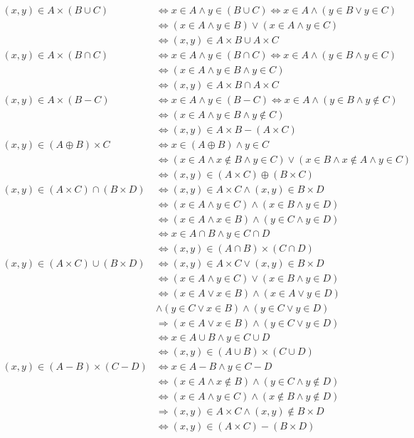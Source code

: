 \begin{align*}
(x,y)\in A\times(B\cup C)&\Leftrightarrow x\in A\land y\in (B\cup C)\Leftrightarrow x\in A\land (y\in B\lor y\in C)\\
&\Leftrightarrow (x\in A\land y\in B)\lor(x\in A\land y\in C)\\&\Leftrightarrow (x,y)\in A\times B\cup A\times C\\
(x,y)\in A\times(B\cap C)&\Leftrightarrow x\in A\land y\in (B\cap C)\Leftrightarrow x\in A\land (y\in B\land y\in C)\\
&\Leftrightarrow (x\in A\land y\in B\land y\in C)\\&\Leftrightarrow (x,y)\in A\times B\cap A\times C\\
(x,y)\in A\times(B-C)&\Leftrightarrow x\in A\land y\in (B-C)\Leftrightarrow x\in A\land (y\in B\land y\not\in C)\\
&\Leftrightarrow (x\in A\land y\in B\land y\not\in C)\\&\Leftrightarrow (x,y)\in A\times B-(A\times C)\\
(x,y)\in (A\oplus B)\times C&\Leftrightarrow x\in (A\oplus B)\land y\in C\\
&\Leftrightarrow (x\in A\land x\not\in B\land y\in C)\lor(x\in B\land x\not\in A\land y\in C)\\
&\Leftrightarrow (x,y)\in(A\times C)\oplus(B\times C)\\
(x,y) \in (A \times C) \cap (B \times D) &\Leftrightarrow (x,y) \in A \times C \land (x,y) \in B \times D \\
&\Leftrightarrow (x \in A \land y \in C) \land (x \in B \land y \in D) \\
&\Leftrightarrow (x \in A \land x \in B) \land (y \in C \land y \in D) \\
&\Leftrightarrow x \in A \cap B \land y \in C \cap D \\
&\Leftrightarrow (x,y) \in (A \cap B) \times (C \cap D)\\
(x,y) \in (A \times C) \cup (B \times D) &\Leftrightarrow (x,y) \in A \times C \lor (x,y) \in B \times D \\
&\Leftrightarrow (x \in A \land y \in C) \lor (x \in B \land y \in D) \\
&\Leftrightarrow (x\in A\lor x\in B)\land(x\in A\lor y\in D)\\ &\land(y\in C\lor x\in B)\land(y\in C\lor y\in D)\\
&\Rightarrow (x \in A \lor x \in B) \land (y \in C \lor y \in D)\\
&\Leftrightarrow x \in A \cup B \land y \in C \cup D \\
&\Leftrightarrow (x,y) \in (A \cup B) \times (C \cup D)\\
(x,y) \in (A - B) \times (C - D) &\Leftrightarrow x \in A - B \land y \in C - D \\
&\Leftrightarrow (x \in A \land x \notin B) \land (y \in C \land y \notin D) \\
&\Leftrightarrow (x \in A \land y \in C) \land (x \notin B \land y \notin D) \\
&\Rightarrow (x,y) \in A \times C \land (x,y) \notin B \times D \\
&\Leftrightarrow (x,y) \in (A \times C) - (B \times D)
\end{align*}
